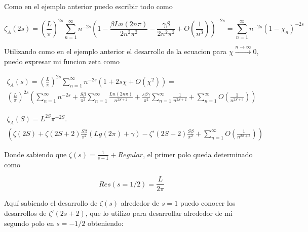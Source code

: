 Como en el ejemplo anterior puedo escribir todo como

\begin{equation}
    \zeta _A (2 s) = ( \frac{L}{\pi} )  ^{2 s} 
    \sum _{n=1} ^{\infty} n ^{- 2  s}
    \left(
    1 - \frac{\beta Ln(2 n \pi)}{2 n^2 \pi ^2} - \frac{\gamma \beta}{2 n^2 \pi ^2 } +
    O(\frac{1}{n^3})  \right) ^{-2 s} =
    \sum _{n=1} ^{\infty} n ^{-2 s} 
    \left(
    1 -\chi _n \right) ^{- 2 s}
\end{equation}

Utilizando como en el ejemplo anterior el desarrollo de la ecuacion para $\chi \xrightarrow{n \rightarrow \infty} 0$, puedo expresar mi funcion zeta como 


\begin{equation}
\begin{array}{c}
    \zeta _A (s) = ( \frac{L}{\pi} ) ^{2 s}
    \sum _{n=1} ^{\infty} 
    n ^{-2s}
    \left(
    1 + 2 s \chi + O(\chi ^2)
    \right) =  \\
    ( \frac{L}{\pi} ) ^{2 s}
    \left(
    \sum _{n=1} ^{\infty} n ^{-2 s} + 
    \frac{S \beta}{\pi ^2} \sum _{n=1} ^{\infty} \frac{Ln(2 n \pi)}{n^ {2S+2} } + 
    \frac{s \beta \gamma}{\pi ^2} 
    \sum _{n=1} ^{\infty} \frac{1}{n^{2S+2}} +
    \sum _{n=1} ^{\infty} O(\frac{1}{n^{2S+3} })
    \right)
\end{array}
\end{equation}


\begin{equation}
\begin{array}{c}
    \zeta _A (S) = 
    L ^{2S} \pi ^{-2 S} . \\
    \left(
    \zeta (2 S) + 
    \zeta (2S+2) \frac{S \beta}{\pi ^2} (Lg(2  \pi)+\gamma) -
    \zeta ' (2S+2) \frac{S \beta}{\pi ^2} +
    \sum _{n=1} ^{\infty} O(\frac{1}{n^{2S+3}})
    \right)
\end{array}
\end{equation}

Donde sabiendo que $\zeta(s) = \frac{1}{s-1} + Regular$, el primer polo queda determinado como

\begin{equation}
    Res(s=1/2) = \frac{L}{2 \pi}    
\end{equation}

Aquí sabiendo el desarrollo de $\zeta(s)$ alrededor de $s=1$ puedo conocer los desarrollos de $\zeta'(2s+2)$, que lo utilizo para desarrollar alrededor de mi segundo polo en $s = -1/2$ obteniendo:

